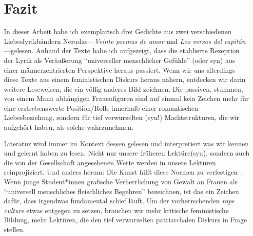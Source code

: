 \section{Fazit}

In dieser Arbeit habe ich exemplarisch drei Gedichte aus zwei verschiedenen Liebeslyrikbändern Nerudas—\textit{Veinte poemas de amor} und \textit{Los versos del capitán}—gelesen.
Anhand der Texte habe ich aufgezeigt, dass die etablierte Rezeption der Lyrik als Veräußerung ``universeller menschlicher Gefühle'' (oder syn) aus einer männerzentrierten Perspektive heraus passiert.
Wenn wir uns allerdings diese Texte aus einem feministischen Diskurs heraus nähern, entdecken wir darin weitere Leseweisen, die ein völlig anderes Bild zeichnen.
Die passiven, stummen, von einem Mann abhängigen Frauenfiguren sind auf einmal kein Zeichen mehr für eine erstrebenswerte Position/Rolle innerhalb einer romantischen Liebesbeziehung, sondern für tief verwurzelten (syn!) Machtstrukturen, die wir aufgehört haben, als solche wahrzunehmen.

Literatur wird immer im Kontext dessen gelesen und interpretiert was wir kennen und gelernt haben zu lesen.
Nicht nur unsere früheren Lektüre(syn), sondern auch die von der Gesellschaft angesehenen Werte werden in unsere Lektüren reinprojiziert.
Und anders herum: Die Kunst hilft diese Normen zu verfestigen~\cite{Kolodny1980}.
Wenn junge Student*innen grafische Verherrlichung von Gewalt an Frauen als ``universell menschliches fleischliches Begehren'' bezeichnen, ist das ein Zeichen dafür, dass irgendwas fundamental schief läuft.
Um der vorherrschenden \textit{rape culture} etwas entgegen zu setzen, brauchen wir mehr kritische feministische Bildung, mehr Lektüren, die den tief verwurzelten patriarchalen Diskurs in Frage stellen.

\begin{comment}
* "als nah, natürlich wahrgenommen", die Leser*innen können sich damit identifizieren
  ** Duncan spricht von "real", "natural/beautiful expression of male/female relationships", die Menschen können sich damit identifizieren, sie sehen die Gedichte als Reflexion der gesellschaftlichen Idealen, die sie gelernt haben anzustreben
  ** Duncan:  "a sort of manual on the workings of modern romantic love and have come  to be regarded by many, as a standard agains which real life  relationships can be judged"
  ** Duncan: ".. in fact it seems extraordinarily "real" and "natural", as if it were not a literary construct at all, but, rather a reflection of real-life experiences. Readers who turn to these poems to learn "what love is supposed to be like", "what men are like", and "what women are like", ultimately receive a skewed message told from the traditional dominant male position"
\end{comment}

